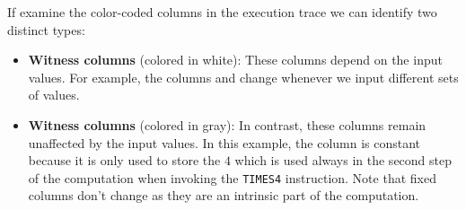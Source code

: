 If examine the color-coded columns in the execution trace we can identify two distinct types:

\begin{itemize}

\item \textbf{Witness columns} (colored in white): These columns depend on the input values. For example, the columns \A and \B change whenever we input different sets of values.

\item \textbf{Witness columns} (colored in gray): In contrast, these columns remain unaffected by the input values. In this example, the column \C is constant because it is only used to store the $4$ which is used always in the second step of the computation when invoking the \texttt{TIMES4} instruction. Note that fixed columns don’t change as they are an intrinsic part of the
computation.

\end{itemize}




